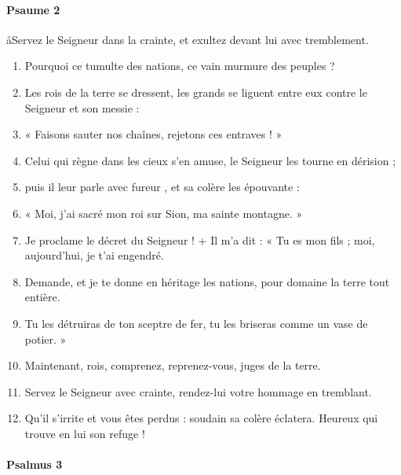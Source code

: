 \documentclass[twoside]{article}
\begin{document}
\begin{paracol}[1]{2}
\switchcolumn

\paragraph{Psaume 2}
\aa Servez le Seigneur dans la crainte, et exultez devant lui avec tremblement.



\begin{enumerate}[wide, itemsep=0mm, labelwidth=!, labelindent=0pt, label=\color{gregoriocolor}\theenumi]
\item Pourquoi ce tumulte des nations, ce vain murmure des peuples ?
\item Les rois de la terre se dressent, les grands se liguent entre eux contre le Seigneur et son messie :
\item « Faisons sauter nos chaînes, rejetons ces entraves ! »
\item Celui qui règne dans les cieux s'en amuse, le Seigneur les tourne en dérision ;
\item puis il leur parle avec fureur , et sa colère les épouvante :
\item « Moi, j'ai sacré mon roi sur Sion, ma sainte montagne. »
\item Je proclame le décret du Seigneur ! + Il m'a dit : « Tu es mon fils ; moi, aujourd'hui, je t'ai engendré.
\item Demande, et je te donne en héritage les nations, pour domaine la terre tout entière.
\item Tu les détruiras de ton sceptre de fer, tu les briseras comme un vase de potier. »
\item Maintenant, rois, comprenez, reprenez-vous, juges de la terre.
\item Servez le Seigneur avec crainte, rendez-lui votre hommage en tremblant.
\item Qu'il s'irrite et vous êtes perdus : soudain sa colère éclatera. Heureux qui trouve en lui son refuge !
\end{enumerate}

\switchcolumn*

\paragraph{Psalmus 3}



\end{paracol}
\end{document}

